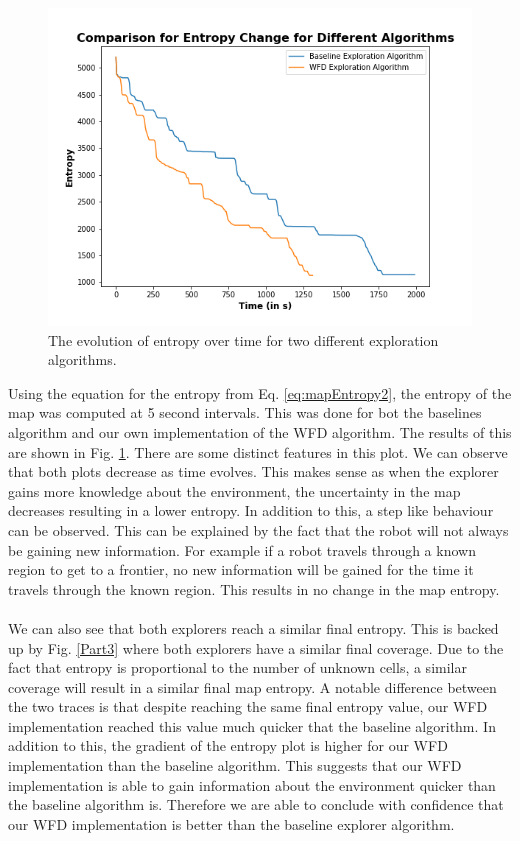 \documentclass[a4paper,12pt]{article}
\begin{document}
			\begin{figure}[H]
				\centering
				\includegraphics[scale=0.5]{images/EntropyChange.png}
				\caption{The evolution of entropy over time for two different exploration algorithms.}
				\label{EntropyChange}
			\end{figure}

			Using the equation for the entropy from Eq. \ref{eq:mapEntropy2}, the entropy of the map was computed at 5 second intervals. This was done for bot the baselines algorithm and our own implementation of the WFD algorithm. The results of this are shown in Fig. \ref{EntropyChange}. There are some distinct features in this plot. We can observe that both plots decrease as time evolves. This makes sense as when the explorer gains more knowledge about the environment, the uncertainty in the map decreases resulting in a lower entropy. In addition to this, a step like behaviour can be observed. This can be explained by the fact that the robot will not always be gaining new information. For example if a robot travels through a known region to get to a frontier, no new information will be gained for the time it travels through the known region. This results in no change in the map entropy. 
			\\
			\\
			We can also see that both explorers reach a similar final entropy. This is backed up by Fig. \ref{Part3} where both explorers have a similar final coverage. Due to the fact that entropy is proportional to the number of unknown cells, a similar coverage will result in a similar final map entropy. A notable difference between the two traces is that despite reaching the same final entropy value, our WFD implementation reached this value much quicker that the baseline algorithm. In addition to this, the gradient of the entropy plot is higher for our WFD implementation than the baseline algorithm. This suggests that our WFD implementation is able to gain information about the environment quicker than the baseline algorithm is. Therefore we are able to conclude with confidence that our WFD implementation is better than the baseline explorer algorithm. 
	
	
	

	\newpage
	\appendix
	\appendixpage
	\addappheadtotoc
	
\end{document}

